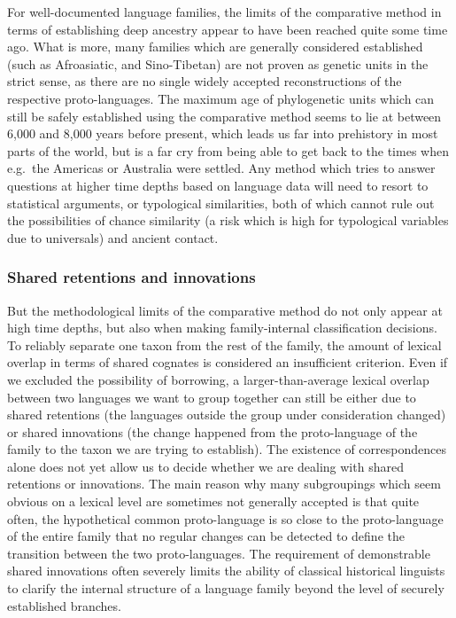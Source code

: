 For well-documented language families, the limits of the comparative method in terms of establishing deep ancestry appear to have been reached quite some time ago. What is more, many families which are generally considered established (such as Afroasiatic, and Sino-Tibetan) are not proven as genetic units in the strict sense, as there are no single widely accepted reconstructions of the respective proto-languages. The maximum age of phylogenetic units which can still be safely established using the comparative method seems to lie at between 6,000 and 8,000 years before present, which leads us far into prehistory in most parts of the world, but is a far cry from being able to get back to the times when e.g.\ the Americas or Australia were settled. Any method which tries to answer questions at higher time depths based on language data will need to resort to statistical arguments, or typological similarities, both of which cannot rule out the possibilities of chance similarity (a risk which is high for 
typological variables due to universals) and ancient contact.

\subsubsection{Shared retentions and innovations}
But the methodological limits of the comparative method do not only appear at high time depths, but also when making family-internal classification decisions. To reliably separate one taxon from the rest of the family, the amount of lexical overlap in terms of shared cognates is considered an insufficient criterion. Even if we excluded the possibility of borrowing, a larger-than-average lexical overlap between two languages we want to group together can still be either due to shared retentions (the languages outside the group under consideration changed) or shared innovations (the change happened from the proto-language of the family to the taxon we are trying to establish). The existence of correspondences alone does not yet allow us to decide whether we are dealing with shared retentions or innovations. The main reason why many subgroupings which seem obvious on a lexical level are sometimes not generally accepted is that quite often, the hypothetical common proto-language is so close to the proto-language 
of the entire family that no regular changes can be detected to define the transition between the two proto-languages. The requirement of demonstrable shared innovations often severely limits the ability of classical historical linguists to clarify the internal structure of a language family beyond the level of securely established branches.

